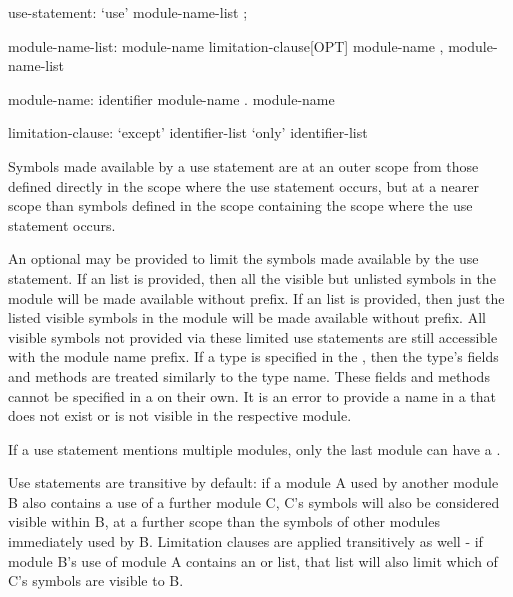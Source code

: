 \begin{syntax}
use-statement:
  `use' module-name-list ;

module-name-list:
  module-name limitation-clause[OPT]
  module-name , module-name-list

module-name:
  identifier
  module-name . module-name

limitation-clause:
  `except' identifier-list
  `only' identifier-list
\end{syntax}

Symbols made available by a use statement are at an outer scope from those
defined directly in the scope where the use statement occurs, but at a
nearer scope than symbols defined in the scope containing the scope where
the use statement occurs.

An optional  may be provided to limit the symbols made
available by the use statement.  If an  list is provided, then all
the visible but unlisted symbols in the module will be made available without
prefix.  If an  list is provided, then just the listed visible
symbols in the module will be made available without prefix.  All visible
symbols not provided via these limited use statements are still accessible with
the module name prefix.  If a type is specified in the ,
then the type's fields and methods are treated similarly to the type name.
These fields and methods cannot be specified in a  on
their own.  It is an error to provide a name in a  that
does not exist or is not visible in the respective module.


If a use statement mentions multiple modules, only the last module can have a
.

Use statements are transitive by default: if a module A used by
another module B also contains a use of a further module C, C's
symbols will also be considered visible within B, at a further scope
than the symbols of other modules immediately used by B.  Limitation clauses
are applied transitively as well - if module B's use of module A contains an
 or  list, that list will also limit which of C's
symbols are visible to B.


